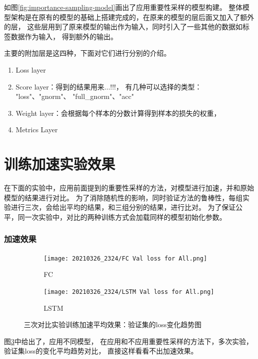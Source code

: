 如图\ref{fig:importance-sampling-model}画出了应用重要性采样的模型构建。
整体模型架构是在原有的模型的基础上搭建完成的，在原来的模型的层后面又加入了额外的层，
这些层用到了原来模型的输出作为输入，同时引入了一些其他的数据如标签数据作为输入，
得到额外的输出。

主要的附加层是这四种，下面对它们进行分别的介绍。
\begin{enumerate}
  \item Loss layer
  \item Score layer：得到的结果用来...!!!，
  有几种可以选择的类型：
  "loss"、"gnorm"、
  "full\_gnorm"、"acc"
  \item Weight layer：会根据每个样本的分数计算得到样本的损失的权重，
  \item Metrics Layer
\end{enumerate}

\section{训练加速实验效果}

  在下面的实验中，应用前面提到的重要性采样的方法，对模型进行加速，并和原始模型的结果进行对比。
  为了消除随机性的影响，同时验证方法的鲁棒性，每组实验进行三次，会给出平均的结果，和三组分别的结果，进行比对。
  为了保证公平，同一次实验中，对比的两种训练方式会加载同样的模型初始化参数。

  \subsubsection{加速效果}
  \begin{figure}
    \centering
    \begin{subfigure}[b]{0.45\textwidth}
      \centering
      \texttt{[image: 20210326\_2324/FC Val loss for All.png]}
      \caption{FC}
      \label{fig:FC Val loss for All}
    \end{subfigure}
    \hfill
    \begin{subfigure}[b]{0.45\textwidth}
        \centering
        \texttt{[image: 20210326\_2324/LSTM Val loss for All.png]}
        \caption{LSTM}
        \label{fig:LSTM Val loss for All}
    \end{subfigure}
    \caption{三次对比实验训练加速平均效果：验证集的loss变化趋势图}
    \label{fig:importance-sampling-performance}
  \end{figure}

  图\ref{fig:importance-sampling-performance}中给出了，应用不同模型，
  在应用和不应用重要性采样的方法下，多次实验，验证集loss的变化平均趋势对比，
  直接这样看看不出加速效果。

